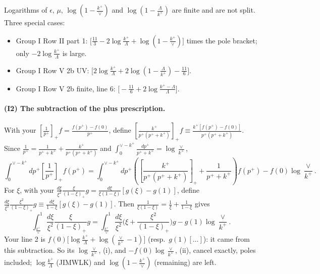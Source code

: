 \documentclass[10pt]{article}
\numberwithin{equation}{section}
\begin{document}
Logarithms of $\epsilon$, $\mu$, $\log(1-\frac{k^+}{\vee})$ and $\log(1-\frac{\Lambda}{k^+})$ are finite and are not split. Three special cases:
\begin{itemize}
\item Group I Row II part 1: $\big[\frac{11}{3}-2\log\frac{k^+}{\Lambda}+\log(1-\frac{k^+}{\vee})\big]$ times the pole bracket; only $-2\log\frac{k^+}{\Lambda}$ is large.
\item Group I Row V 2b UV: $\big[2\log\frac{k^+}{\Lambda}+2\log(1-\frac{\Lambda}{k^+})-\frac{11}{6}\big]$.
\item Group I Row V 2b finite, line 6: $\big[-\frac{11}{6}+2\log\frac{k^+-\Lambda}{\Lambda}\big]$.
\end{itemize}

\paragraph{(I2) The subtraction of the plus prescription.}\label{sec:exact} With your $\left[\frac{1}{p^+}\right]_+f=\frac{f(p^+)-f(0)}{p^+}$, define $\left[\frac{k^+}{p^+(p^++k^+)}\right]_+f\equiv\frac{k^+[f(p^+)-f(0)]}{p^+(p^++k^+)}$. Since $\frac{1}{p^+}=\frac{1}{p^++k^+}+\frac{k^+}{p^+(p^++k^+)}$ and $\int_0^{\vee-k^+}\frac{dp^+}{p^++k^+}=\log\frac{\vee}{k^+}$,
\begin{equation}
\int_0^{\vee-k^+}dp^+\left[\frac{1}{p^+}\right]_+f(p^+)=\int_0^{\vee-k^+}dp^+\left(\left[\frac{k^+}{p^+(p^++k^+)}\right]_++\frac{1}{p^++k^+}\right)f(p^+)-f(0)\log\frac{\vee}{k^+}.
\label{eq:I2}
\end{equation}
For $\xi$, with your $\frac{d\xi}{\xi^2}\frac{\xi}{(1-\xi)_+}g=\frac{d\xi}{\xi(1-\xi)}[g(\xi)-g(1)]$, define $\frac{d\xi}{\xi^2}\frac{\xi^2}{(1-\xi)_+}g\equiv\frac{d\xi}{1-\xi}[g(\xi)-g(1)]$. Then $\frac{1}{\xi(1-\xi)}=\frac{1}{\xi}+\frac{1}{1-\xi}$ gives
\begin{equation}
\int_{\frac{k^+}{\vee}}^1\frac{d\xi}{\xi^2}\frac{\xi}{(1-\xi)_+}g=\int_{\frac{k^+}{\vee}}^1\frac{d\xi}{\xi^2}\Big(\xi+\frac{\xi^2}{(1-\xi)_+}\Big)g-g(1)\log\frac{\vee}{k^+}.
\label{eq:I2xi}
\end{equation}
Your line 2 is $f(0)\big[\log\frac{k^+}{\Lambda}+\log(\frac{\vee}{k^+}-1)\big]$ (resp.\ $g(1)[\dots]$): it came from this subtraction. So its $\log\frac{\vee}{k^+}$, (i), and $-f(0)\log\frac{\vee}{k^+}$, (ii), cancel exactly, poles included; $\log\frac{k^+}{\Lambda}$ (JIMWLK) and $\log(1-\frac{k^+}{\vee})$ (remaining) are left.
\end{document}
